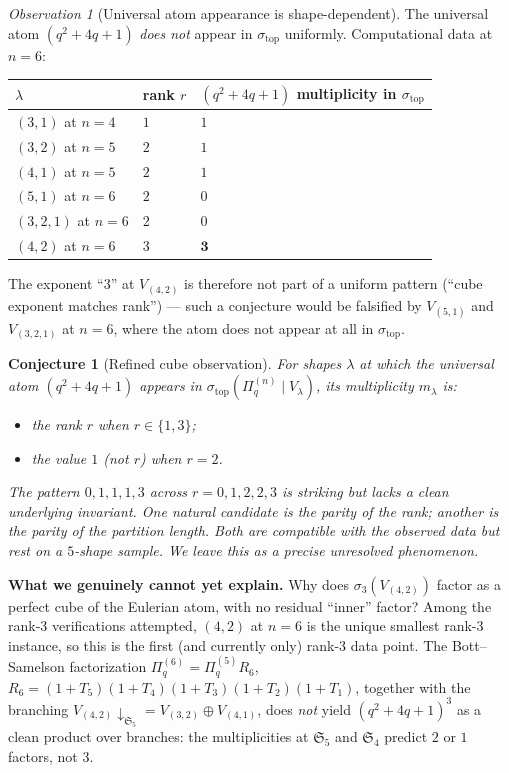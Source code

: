 \documentclass[11pt]{article}
\theoremstyle{plain}
\newtheorem{conjecture}[theorem]{Conjecture}
\theoremstyle{definition}
\theoremstyle{remark}
\newtheorem{observation}[theorem]{Observation}
\newcommand{\Sym}{\mathfrak{S}}
\newcommand{\Pibs}{\Pi_q}
\begin{document}
\begin{observation}[Universal atom appearance is shape-dependent]\label{obs:atom-failure}
The universal atom $(q^2+4q+1)$ \emph{does not} appear in
$\sigma_{\mathrm{top}}$ uniformly. Computational data at $n = 6$:
\begin{center}
\begin{tabular}{lll}
\toprule
$\lambda$ & rank $r$ & $(q^2+4q+1)$ multiplicity in $\sigma_{\mathrm{top}}$ \\
\midrule
$(3,1)$ at $n=4$  & $1$ & $1$ \\
$(3,2)$ at $n=5$  & $2$ & $1$ \\
$(4,1)$ at $n=5$  & $2$ & $1$ \\
$(5,1)$ at $n=6$  & $2$ & $0$ \\
$(3,2,1)$ at $n=6$ & $2$ & $0$ \\
$(4,2)$ at $n=6$  & $3$ & $\mathbf{3}$ \\
\bottomrule
\end{tabular}
\end{center}
The exponent ``$3$'' at $V_{(4,2)}$ is therefore not part of a uniform pattern
(``cube exponent matches rank'') --- such a conjecture would be falsified by
$V_{(5,1)}$ and $V_{(3,2,1)}$ at $n = 6$, where the atom does not appear at
all in $\sigma_{\mathrm{top}}$.
\end{observation}

\begin{conjecture}[Refined cube observation]\label{conj:refined-cube}
For shapes $\lambda$ at which the universal atom $(q^2+4q+1)$ appears in
$\sigma_{\mathrm{top}}(\Pibs^{(n)} \mid V_\lambda)$, its multiplicity $m_\lambda$
is:
\begin{itemize}
\item the rank $r$ when $r \in \{1, 3\}$;
\item the value $1$ (not $r$) when $r = 2$.
\end{itemize}
The pattern $0,1,1,1,3$ across $r = 0,1,2,2,3$ is striking but lacks a clean
underlying invariant. One natural candidate is the parity of the rank;
another is the parity of the partition length. Both are
\emph{compatible} with the observed data but rest on a $5$-shape
sample. We leave this as a precise unresolved phenomenon.
\end{conjecture}

\noindent
\textbf{What we genuinely cannot yet explain.} Why does $\sigma_3(V_{(4,2)})$
factor as a perfect cube of the Eulerian atom, with no residual ``inner''
factor? Among the rank-3 verifications attempted, $(4,2)$ at $n=6$ is the
unique smallest rank-3 instance, so this is the first (and currently only)
rank-3 data point. The Bott--Samelson factorization
$\Pibs^{(6)} = \Pibs^{(5)} R_6$, $R_6 = (1+T_5)(1+T_4)(1+T_3)(1+T_2)(1+T_1)$,
together with the branching $V_{(4,2)} \downarrow_{\Sym_5} = V_{(3,2)} \oplus V_{(4,1)}$,
does \emph{not} yield $(q^2+4q+1)^3$ as a clean product over branches: the
multiplicities at $\Sym_5$ and $\Sym_4$ predict $2$ or $1$ factors, not $3$.
\end{document}
